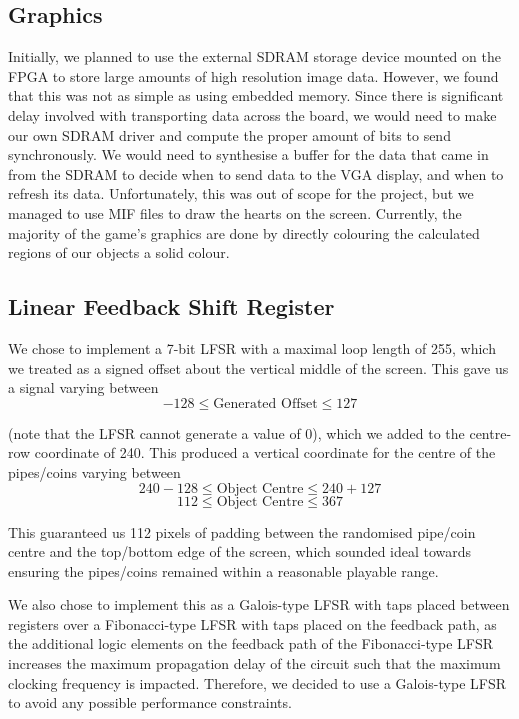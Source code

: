 \documentclass[conference]{IEEEtran}
\begin{document}
\subsection{Graphics}
Initially, we planned to use the external SDRAM storage device mounted on the FPGA to store large amounts of high resolution image data. However, we found that this was not as simple as using embedded memory. Since there is significant delay involved with transporting data across the board, we would need to make our own SDRAM driver and compute the proper amount of bits to send synchronously. We would need to synthesise a buffer for the data that came in from the SDRAM to decide when to send data to the VGA display, and when to refresh its data. Unfortunately, this was out of scope for the project, but we managed to use MIF files to draw the hearts on the screen. Currently, the majority of the game's graphics are done by directly colouring the calculated regions of our objects a solid colour.

\subsection{Linear Feedback Shift Register}
We chose to implement a 7-bit LFSR with a maximal loop length of 255, which we treated as a signed offset about the vertical middle of the screen. This gave us a signal varying between
\begin{equation}
	-128 \leq \text{Generated Offset} \leq 127
\end{equation}


(note that the LFSR cannot generate a value of 0), which we added to the centre-row coordinate of 240. This produced a vertical coordinate for the centre of the pipes/coins varying between
\begin{equation}
	240-128 \leq \text{Object Centre} \leq 240+127
\end{equation}
\begin{equation}
	112 \leq \text{Object Centre} \leq 367
\end{equation}

This guaranteed us 112 pixels of padding between the randomised pipe/coin centre and the top/bottom edge of the screen, which sounded ideal towards ensuring the pipes/coins remained within a reasonable playable range.

We also chose to implement this as a Galois-type LFSR with taps placed between registers over a Fibonacci-type LFSR with taps placed on the feedback path, as the additional logic elements on the feedback path of the Fibonacci-type LFSR increases the maximum propagation delay of the circuit such that the maximum clocking frequency is impacted. Therefore, we decided to use a Galois-type LFSR to avoid any possible performance constraints.
\end{document}
